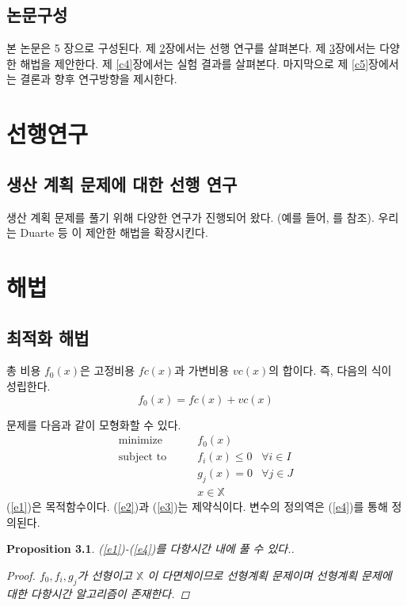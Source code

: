 \documentclass[oneside, ko,ms]{snuthesis_utf8_kor}
\newtheorem{proposition}[theorem]{Proposition}
\begin{document}
\section{논문구성}\label{s1.3}
본 논문은 5 장으로 구성된다. 제 \ref{c2}장에서는 선행 연구를 살펴본다. 제 \ref{c3}장에서는 다양한 해법을 제안한다. 제 \ref{c4}장에서는 실험 결과를 살펴본다. 마지막으로 제 \ref{c5}장에서는 결론과 향후 연구방향을 제시한다.

\chapter{선행연구}\label{c2}
\section{생산 계획 문제에 대한 선행 연구}\label{s2.1}
생산 계획 문제를 풀기 위해 다양한 연구가 진행되어 왔다. (예를 들어, \cite{bertsimas1997introduction, gicquel2008mip, jans2008modeling,wolsey1998integer}를 참조). 우리는 Duarte 등 \cite{duarte2013discrete}이 제안한 해법을 확장시킨다.


\newpage
\chapter{해법}\label{c3}
\section{최적화 해법}\label{s3.1}
 총 비용 $f_0(x)$은 고정비용 $fc(x)$과 가변비용 $vc(x)$의 합이다. 즉, 다음의 식이 성립한다.
\begin{equation}
f_0(x)=fc(x)+vc(x)
\end{equation}

문제를 다음과 같이 모형화할 수 있다.
\begin{align}
\text{minimize} \qquad &f_0(x) \label{e1} \\
\text{subject to} \qquad &f_i(x)\leq 0 &\forall i \in I \label{e2}\\
&g_j(x)=0 &\forall j \in J \label{e3}\\
&x\in \mathbb{X} \label{e4}
\end{align}
(\ref{e1})은 목적함수이다. (\ref{e2})과 (\ref{e3})는 제약식이다. 변수의 정의역은 (\ref{e4})를 통해 정의된다.
\begin{proposition}\label{p3.1}
(\ref{e1})-(\ref{e4})를 다항시간 내에 풀 수 있다..  
\begin{proof}
 $f_0, f_i ,g_j$가 선형이고 $\mathbb{X}$ 이 다면체이므로 선형계획 문제이며 선형계획 문제에 대한 다항시간 알고리즘이 존재한다.
\end{proof}
\end{proposition}
\newpage
\end{document}
